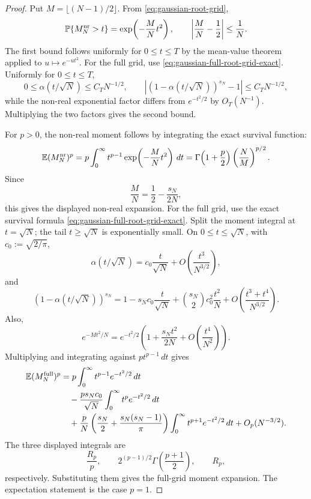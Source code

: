\documentclass[11pt]{amsart}
\numberwithin{equation}{section}
\theoremstyle{definition}
\theoremstyle{remark}
\newcommand{\Prob}{\mathbb P}
\newcommand{\Exp}{\mathbb E}
\begin{document}
\begin{proof}
Put \(M=\lfloor(N-1)/2\rfloor\).  From \eqref{eq:gaussian-root-grid},
\[
  \Prob\{M_N^{\rm nr}>t\}=\exp\!\left(-\frac{M}{N}t^2\right),
  \qquad
  \left|\frac{M}{N}-\frac12\right|\le \frac1N.
\]
The first bound follows uniformly for \(0\le t\le T\) by the mean-value
theorem applied to \(u\mapsto e^{-ut^2}\).  For the full grid, use
\eqref{eq:gaussian-full-root-grid-exact}.  Uniformly for \(0\le t\le T\),
\[
  0\le \alpha(t/\sqrt N)\le C_TN^{-1/2},
  \qquad
  \left|(1-\alpha(t/\sqrt N))^{s_N}-1\right|\le C_TN^{-1/2},
\]
while the non-real exponential factor differs from \(e^{-t^2/2}\) by
\(O_T(N^{-1})\).  Multiplying the two factors gives the second bound.

For \(p>0\), the non-real moment follows by integrating the exact survival
function:
\[
  \Exp (M_N^{\rm nr})^p
  =p\int_0^\infty t^{p-1}\exp\!\left(-\frac{M}{N}t^2\right)\,dt
  =\Gamma\!\left(1+\frac p2\right)\left(\frac{N}{M}\right)^{p/2}.
\]
Since
\[
  \frac{M}{N}=\frac12-\frac{s_N}{2N},
\]
this gives the displayed non-real expansion.
For the full grid, use the exact survival formula
\eqref{eq:gaussian-full-root-grid-exact}.  Split the moment integral at
\(t=\sqrt N\); the tail \(t\ge\sqrt N\) is exponentially small.  On
\(0\le t\le\sqrt N\), with \(c_0:=\sqrt{2/\pi}\),
\[
  \alpha(t/\sqrt N)=c_0\frac{t}{\sqrt N}
  +O\!\left(\frac{t^3}{N^{3/2}}\right),
\]
and
\[
  (1-\alpha(t/\sqrt N))^{s_N}
  =
  1-s_Nc_0\frac{t}{\sqrt N}
  +\binom{s_N}{2}c_0^2\frac{t^2}{N}
  +O\!\left(\frac{t^3+t^4}{N^{3/2}}\right).
\]
Also,
\[
  e^{-Mt^2/N}
  =e^{-t^2/2}\left(1+\frac{s_Nt^2}{2N}
  +O\!\left(\frac{t^4}{N^2}\right)\right).
\]
Multiplying and integrating against \(pt^{p-1}\,dt\) gives
\[
\begin{aligned}
  \Exp (M_N^{\rm full})^p
  &=p\int_0^\infty t^{p-1}e^{-t^2/2}\,dt  \\
  &\quad
  -\frac{ps_Nc_0}{\sqrt N}\int_0^\infty t^p e^{-t^2/2}\,dt \\
  &\quad
  +\frac{p}{N}\left(\frac{s_N}{2}+\frac{s_N(s_N-1)}{\pi}\right)
    \int_0^\infty t^{p+1}e^{-t^2/2}\,dt
  +O_p(N^{-3/2}).
\end{aligned}
\]
The three displayed integrals are
\[
  \frac{R_p}{p},\qquad
  2^{(p-1)/2}\Gamma\!\left(\frac{p+1}{2}\right),\qquad
  R_p,
\]
respectively.  Substituting them gives the full-grid moment expansion.  The
expectation statement is the case \(p=1\).
\end{proof}
\end{document}
